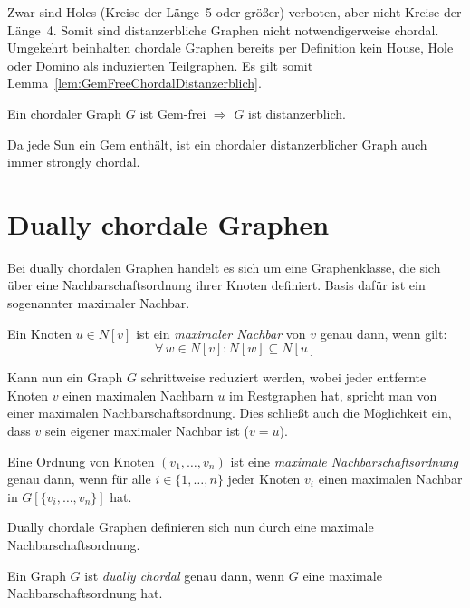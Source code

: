 Zwar sind Holes (Kreise der Länge~5 oder größer) verboten, aber nicht Kreise der Länge~4. Somit sind distanzerbliche Graphen nicht notwendigerweise chordal. Umgekehrt beinhalten chordale Graphen bereits per Definition kein House, Hole oder Domino als induzierten Teilgraphen. Es gilt somit Lemma~\ref{lem:GemFreeChordalDistanzerblich}.

\begin{Lemma}\label{lem:GemFreeChordalDistanzerblich}
    Ein chordaler Graph $G$ ist Gem-frei $\Rightarrow$ $G$ ist distanzerblich.
\end{Lemma}

Da jede Sun ein Gem enthält, ist ein chordaler distanzerblicher Graph auch immer strongly chordal.

\section{Dually chordale Graphen}\label{sec:DuallyChordalGraphs}

Bei dually chordalen Graphen handelt es sich um eine Graphenklasse, die sich über eine Nachbarschaftsordnung ihrer Knoten definiert. Basis dafür ist ein sogenannter maximaler Nachbar.

\begin{mydef}
    Ein Knoten $u\in N[v]$ ist ein \emph{maximaler Nachbar} von $v$ genau dann, wenn gilt:
    \[ \forall\,w \in N[v]: N[w] \subseteq N[u] \]
    \end{mydef}

Kann nun ein Graph $G$ schrittweise reduziert werden, wobei jeder entfernte Knoten $v$ einen maximalen Nachbarn $u$ im Restgraphen hat, spricht man von einer maximalen Nachbarschaftsordnung. Dies schließt auch die Möglichkeit ein, dass $v$ sein eigener maximaler Nachbar ist ($v=u$).

\begin{mydef}
    Eine Ordnung von Knoten $(v_1,\ldots,v_n)$ ist eine \emph{maximale Nachbarschaftsordnung} genau dann, wenn für alle $i\in\{1,\ldots,n\}$ jeder Knoten $v_i$ einen maximalen Nachbar in $G[\{v_i,\ldots,v_n\}]$ hat.
\end{mydef}

Dually chordale Graphen definieren sich nun durch eine maximale Nachbarschaftsordnung.

\begin{mydef}
    Ein Graph $G$ ist \emph{dually chordal} genau dann, wenn $G$ eine maximale Nachbarschaftsordnung hat.
\end{mydef}

